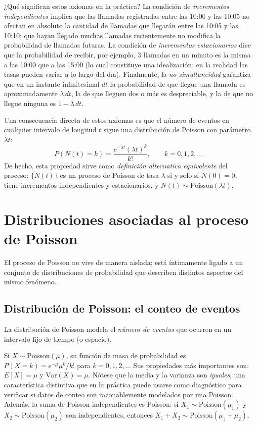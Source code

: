 \documentclass[11pt, letterpaper]{article}
\begin{document}
¿Qué significan estos axiomas en la práctica? La condición de \emph{incrementos independientes} implica que las llamadas registradas entre las 10:00 y las 10:05 no afectan en absoluto la cantidad de llamadas que llegarán entre las 10:05 y las 10:10; que hayan llegado muchas llamadas recientemente no modifica la probabilidad de llamadas futuras. La condición de \emph{incrementos estacionarios} dice que la probabilidad de recibir, por ejemplo, 3 llamadas en un minuto es la misma a las 10:00 que a las 15:00 (lo cual constituye una idealización; en la realidad las tasas pueden variar a lo largo del día). Finalmente, la \emph{no simultaneidad} garantiza que en un instante infinitesimal $dt$ la probabilidad de que llegue una llamada es aproximadamente $\lambda\,dt$, la de que lleguen dos o más es despreciable, y la de que no llegue ninguna es $1 - \lambda\,dt$.

Una consecuencia directa de estos axiomas es que el número de eventos en cualquier intervalo de longitud $t$ sigue una distribución de Poisson con parámetro $\lambda t$:
\[
    P(N(t) = k) = \frac{e^{-\lambda t}(\lambda t)^k}{k!}, \qquad k = 0, 1, 2, \ldots
\]
De hecho, esta propiedad sirve como \emph{definición alternativa equivalente} del proceso: $\{N(t)\}$ es un proceso de Poisson de tasa $\lambda$ si y solo si $N(0)=0$, tiene incrementos independientes y estacionarios, y $N(t) \sim \text{Poisson}(\lambda t)$.


\section{Distribuciones asociadas al proceso de Poisson}

El proceso de Poisson no vive de manera aislada; está íntimamente ligado a un conjunto de distribuciones de probabilidad que describen distintos aspectos del mismo fenómeno.

\subsection{Distribución de Poisson: el conteo de eventos}

La distribución de Poisson modela el \emph{número de eventos} que ocurren en un intervalo fijo de tiempo (o espacio).

Si $X \sim \text{Poisson}(\mu)$, su función de masa de probabilidad es $P(X=k) = e^{-\mu}\mu^k / k!$ para $k = 0,1,2,\ldots$ Sus propiedades más importantes son: $E[X] = \mu$ y $\text{Var}(X) = \mu$. Nótese que la media y la varianza son \emph{iguales}, una característica distintiva que en la práctica puede usarse como diagnóstico para verificar si datos de conteo son razonablemente modelados por una Poisson. Además, la suma de Poisson independientes es Poisson: si $X_1 \sim \text{Poisson}(\mu_1)$ y $X_2 \sim \text{Poisson}(\mu_2)$ son independientes, entonces $X_1 + X_2 \sim \text{Poisson}(\mu_1 + \mu_2)$.
\end{document}
